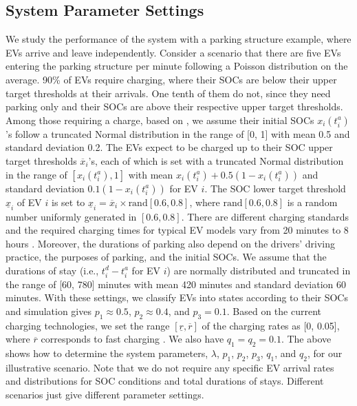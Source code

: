 \documentclass[journal]{IEEEtran}
\begin{document}
\subsection{System Parameter Settings} \label{subsec:parameter}
We study the performance of the system with a parking structure example, where EVs arrive
and leave independently.  Consider a scenario that there are five EVs entering the
parking structure per minute following a Poisson distribution on the average.  90\% of EVs require charging, where their SOCs
are below their upper target thresholds at their arrivals.  One tenth of them
do not, since they need parking only and their SOCs are above their respective
upper target thresholds.  Among those requiring a charge, based on \cite{SOCdistribution}, we assume their initial SOCs $x_i(t_i^a)$'s follow a truncated Normal distribution in the range of [0, 1] with mean 0.5 and standard deviation 0.2. The EVs expect to be
charged up to their SOC upper target thresholds $\overline{x}_i$'s, each of which is set with a truncated Normal distribution in the range of $[x_i(t_i^a),1]$ with mean $x_i(t_i^a)+ 0.5 (1-x_i(t_i^a))$ and standard deviation $0.1 (1-x_i(t_i^a))$ for EV $i$. The SOC lower target threshold $\underline{x}_i$ of EV $i$ is set to $\underline{x}_i = \overline{x}_i\times \text{rand}[0.6,0.8]$, where $\text{rand}[0.6,0.8]$ is a random number uniformly generated in $[0.6,0.8]$. 
There are different charging standards and the required charging times for typical EV models vary from 20 minutes to 8 hours \cite{chargingDuration}. Moreover, the durations of parking also depend on the drivers' driving practice, the purposes of parking, and the initial SOCs. We assume that the durations of stay (i.e., $t_i^d -t_i^a$ for EV $i$) are normally distributed and truncated in the range of [60, 780] minutes with mean 420 minutes and standard deviation 60 minutes. With these settings, we classify EVs into states according to their SOCs and simulation gives $p_1 \approx 0.5$, $p_2 \approx 0.4$, and $p_3 = 0.1$. Based on the current charging technologies, we set the range $[\underline{r},\overline{r}]$ of the charging rates as [0, 0.05], where $\overline{r}$ corresponds to fast charging \cite{fastcharging}. We also have $q_1 = q_2 = 0.1$.
The above shows how to determine the system parameters, $\lambda$, $p_1$, $p_2$, $p_3$, $q_1$, and $q_2$, for our illustrative scenario. Note that we do not require any specific EV arrival rates and distributions for SOC conditions and total durations of stays. Different scenarios just give different parameter settings.
\end{document}
